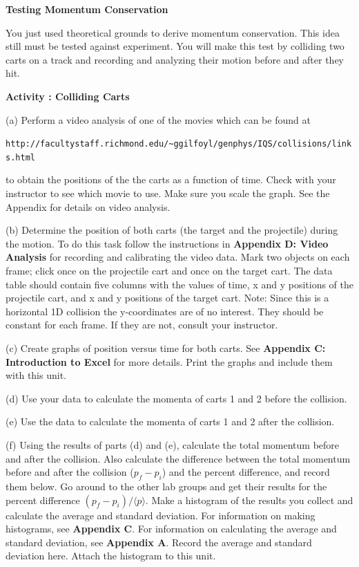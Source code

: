 \newpage

\textbf{Testing Momentum Conservation }

You just used theoretical grounds to derive momentum conservation. This idea
still must be tested against experiment. You will make this test by colliding
two carts on a track and recording and analyzing their motion before and after
they hit.

\textbf{Activity : Colliding Carts }


(a) Perform a video analysis of one of the movies which can be found at

\verb!http://facultystaff.richmond.edu/~ggilfoyl/genphys/IQS/collisions/links.html!

\noindent to obtain the positions of the the carts as a function of time. 
Check with your instructor to see which movie to use.
Make sure you scale the graph.
See the Appendix for details on video analysis.


(b) Determine the position of both carts (the target and the projectile) during
the motion. To do this task follow the instructions in \textbf{Appendix D: Video
Analysis} for recording and calibrating the video data. Mark two objects on
each frame; click once on the projectile cart and once on the target cart. The
data table should contain five columns with the values of time, x and y positions
of the projectile cart, and x and y positions of the target cart. Note: Since
this is a horizontal 1D collision the y-coordinates are of no interest. They
should be constant for each frame. If they are not, consult your instructor.

(c) Create graphs of position versus time for both carts. See \textbf{Appendix
C: Introduction to Excel} for more details. Print the graphs and include
them with this unit.

(d) Use your data to calculate the momenta of carts 1 and 2 before the collision.
\vspace{50mm}

(e) Use the data to calculate the momenta of carts 1 and 2 after the collision.
\vspace{60mm}

(f) Using the results of parts (d) and (e), calculate the total momentum before and after the collision. 
Also calculate the difference between the total momentum before and after the collision ($p_f - p_i$) 
and the percent difference, and record them below.
Go around to the other lab groups and get their results for the percent difference $(p_f - p_i)/\langle p\rangle$.
Make a histogram of the results you collect and calculate the average and standard deviation.
For information on making histograms, see \textbf{Appendix C}. For information on calculating the average and
standard deviation, see \textbf{Appendix A}. Record the average and standard deviation here.
Attach the histogram to this unit.
\vspace{50mm}

